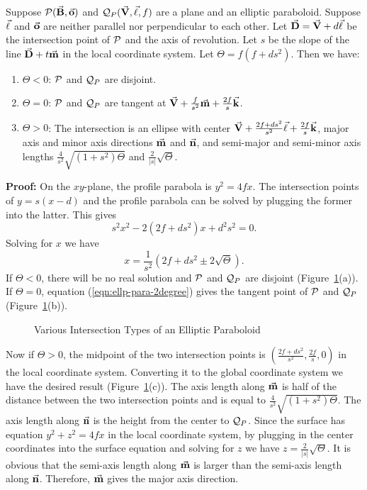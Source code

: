 \begin{theorem}
\label{thm:elliptic-paraboloid}
     Suppose ${\cal P}(\vec{\bf B},\vec{\bf o})$ and
${\cal Q}_P(\vec{\bf V},\vec{\bf \ell},f)$ are a plane and an elliptic paraboloid.
Suppose $\vec{\bf \ell}$ and $\vec{\bf o}$ are neither parallel nor perpendicular
to each other.  Let $\vec{\bf D}=\vec{\bf V}+d\vec{\bf \ell}$ be the intersection
point of ${\cal P}$ and the axis of revolution.
Let $s$ be the slope of the line $\vec{\bf D}+t\vec{\bf m}$ in the local
coordinate system.  Let $\Theta=f(f+ds^2)$.  Then we have:
\begin{enumerate}
     \item $\Theta<0$: ${\cal P}$ and ${\cal Q}_P$ are disjoint.
     \item $\Theta=0$: ${\cal P}$ and ${\cal Q}_P$ are tangent at
          $\vec{\bf V}+\frac{f}{s^2}\vec{\bf m}+\frac{2f}{s}\vec{\bf k}$.
     \item $\Theta>0$: The intersection is an ellipse with center
          $\vec{\bf V}+\frac{2f+ds^2}{s^2}\vec{\bf \ell}+\frac{2f}{s}\vec{\bf k}$,
          major axis and minor axis directions $\vec{\bf m}$ and $\vec{\bf n}$,
          and semi-major and semi-minor axis lengths
          $\frac{4}{s^2}\sqrt{(1+s^2)\Theta}$ and $\frac{2}{|s|}\sqrt{\Theta}$.
\end{enumerate}
\end{theorem}
{\bf Proof:}  On the $xy$-plane, the profile parabola is $y^2=4fx$.
The intersection points of $y=s(x-d)$ and the profile parabola can be solved
by plugging the former into the latter.  This gives
\begin{equation}
\label{eqn:ellp-para-2degree}
     s^2x^2-2(2f+ds^2)x+d^2s^2=0.
\end{equation}
Solving for $x$ we have
\[ x = \frac{1}{s^2}(2f+ds^2\pm 2\sqrt{\Theta}).  \]
If $\Theta<0$, there will be no real solution and ${\cal P}$ and
${\cal Q}_P$ are disjoint (Figure~\ref{fig:para}(a)).
If $\Theta=0$, equation (\ref{eqn:ellp-para-2degree}) gives the
tangent point of ${\cal P}$ and ${\cal Q}_P$ (Figure~\ref{fig:para}(b)).
\begin{figure}
\vspace{6cm}
\caption{Various Intersection Types of an Elliptic Paraboloid}
\label{fig:para}
\end{figure}

     Now if $\Theta>0$, the midpoint of the two intersection points is
$\left(\frac{2f+ds^2}{s^2},\frac{2f}{s},0\right)$ in the local coordinate
system.  Converting it to the global coordinate system we have the desired
result (Figure~\ref{fig:para}(c)).  The axis length along $\vec{\bf m}$ is half
of the distance between the two intersection points and is equal to
$\frac{4}{s^2}\sqrt{(1+s^2)\Theta}$.  The axis length along $\vec{\bf n}$
is the height from the center to ${\cal Q}_P$.  Since the
surface has equation $y^2+z^2=4fx$ in the local coordinate system, by plugging
in the center coordinates into the surface equation and solving for $z$ we have
$z=\frac{2}{|s|}\sqrt{\Theta}$.  It is obvious that the semi-axis length
along $\vec{\bf m}$ is larger than the semi-axis length along $\vec{\bf n}$.
Therefore, $\vec{\bf m}$ gives the major axis direction.  \QED

